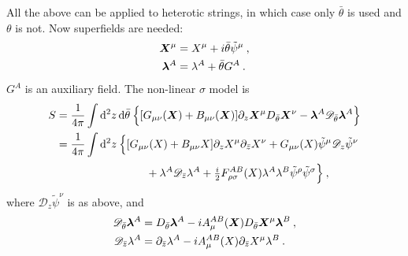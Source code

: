 All the above can be applied to heterotic strings, in which case only $\bar{\theta}$ is used and $\theta$ is not. Now superfields are needed:
\begin{subequations}
	\begin{align}
		\bm{X}^{\mu} &= X^{\mu}+i\bar{\theta}\tilde{\psi}^{\mu} \:, \label{12.3.29a} \\
		\bm{\lambda}^{A} &= \lambda^{A} + \bar{\theta}G^{A} \:. \label{12.3.29b} 
	\end{align} \label{12.3.29}
\end{subequations}
$G^{A}$ is an auxiliary field. The non-linear $\sigma$ model is
\begin{align}
	S&= \frac{1}{4\pi} \int \dif^{2}z\,\dif\bar{\theta}\:\Bigl\{[G_{\mu\nu}(\bm{X})+B_{\mu\nu}(\bm{X})]
	\partial_{z}\bm{X}^{\mu}D_{\bar{\theta}}\bm{X}^{\nu} 
	- \bm{\lambda}^{A}\mathscr{D}_{\bar{\theta}}\bm{\lambda}^{A} \Bigr\} \nonumber \\
	&=\frac{1}{4\pi} \int \dif^{2}z\:\Bigl\{ [G_{\mu\nu}(X)+B_{\mu\nu}X]\partial_{z}X^{\mu}\partial_{\bar{z}}X^{\nu}
	+G_{\mu\nu}(X)\tilde{\psi}^{\mu}\mathscr{D}_{z}\tilde{\psi}^{\nu} \nonumber \\
	&\phantom{=\frac{1}{4\pi} \int \dif^{2}z\:\Bigl\{ [G_{\mu\nu}}+\lambda^{A}\mathscr{D}_{\bar{z}}\lambda^{A}
	+\tfrac{\mi}{2}F_{\rho\sigma}^{AB}(X)\lambda^{A}\lambda^{B}\tilde{\psi}^{\rho}\tilde{\psi}^{\sigma}\Bigr\}\:,
	\label{12.3.30}
\end{align}
where $\mathscr{D}_{z}\tilde{\psi}^{\nu}$ is as above, and
\begin{subequations}
	\begin{align}
		\mathscr{D}_{\bar{\theta}}\bm{\lambda}^{A}&=D_{\bar{\theta}}\bm{\lambda}^{A}
		-i A_{\mu}^{AB}(\bm{X})D_{\bar{\theta}}\bm{X}^{\mu}\bm{\lambda}^{B} \:, \label{12.3.31a} \\
		\mathscr{D}_{\bar{z}}\lambda^{A} &= \partial_{\bar{z}}\lambda^{A} 
		- i A_{\mu}^{AB}(X)\partial_{\bar{z}}X^{\mu}\lambda^{B} \:. \label{12.3.31b}
	\end{align} \label{12.3.31}
\end{subequations}
